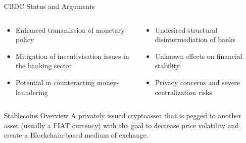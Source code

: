 \documentclass[handout]{beamer}
\begin{document}
\begin{frame}{CBDC Status and Arguments}
{\begin{columns}[T]
	\begin{column}{0.45\textwidth}
	\footnotesize{
		\begin{itemize}
			\item Enhanced transmission of monetary policy
			\item Mitigation of incentivisation issues in the banking sector
			\item Potential in counteracting money-laundering
		\end{itemize}
		}
	\end{column}
	\begin{column}{0.45\textwidth}
	\footnotesize{
		\begin{itemize}
			\item Undesired structural disintermediation of banks 
			\item Unknown effects on financial stability
			\item Privacy concerns and severe centralization risks
		\end{itemize}
		}
	\end{column}
\end{columns}
}

\end{frame}

\begin{frame}{Stablecoins Overview}
A privately issued cryptoasset that is \color{focus} pegged to another asset \color{black} (usually a FIAT currency) with the goal to decrease price volatility and create a Blockchain-based medium of exchange. 

\vspace{1.5em}


\end{frame}
\end{document}
